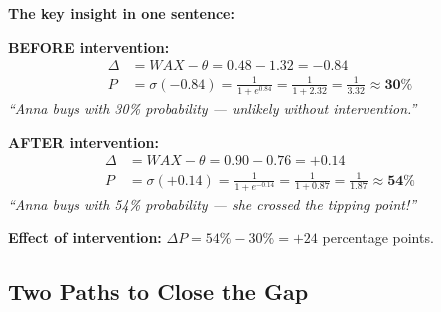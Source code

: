 \begin{intuition}
\textbf{The key insight in one sentence:}

\begin{center}
\end{center}
\end{intuition}

\begin{example}
\textbf{BEFORE intervention:}
\begin{align*}
\Delta &= WAX - \theta = 0.48 - 1.32 = -0.84\\
P &= \sigma(-0.84) = \frac{1}{1 + e^{0.84}} = \frac{1}{1 + 2.32} = \frac{1}{3.32} \approx \mathbf{30\%}
\end{align*}
\textit{``Anna buys with 30\% probability --- unlikely without intervention.''}

\vspace{6pt}
\textbf{AFTER intervention:}
\begin{align*}
\Delta &= WAX - \theta = 0.90 - 0.76 = +0.14\\
P &= \sigma(+0.14) = \frac{1}{1 + e^{-0.14}} = \frac{1}{1 + 0.87} = \frac{1}{1.87} \approx \mathbf{54\%}
\end{align*}
\textit{``Anna buys with 54\% probability --- she crossed the tipping point!''}

\vspace{6pt}
\textbf{Effect of intervention:} $\Delta P = 54\% - 30\% = +24$ percentage points.
\end{example}



\subsection{Two Paths to Close the Gap}

